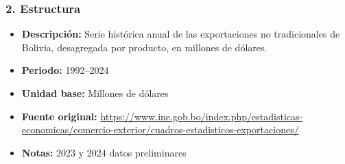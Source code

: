\documentclass[12pt,a4paper]{article}
\begin{document}
\subsubsection*{2. Estructura}
\begin{itemize}
   \item \textbf{Descripción:} Serie histórica anual de las exportaciones no tradicionales de Bolivia, desagregada por producto, en millones de dólares.
  \item \textbf{Periodo:} 1992--2024
  \item \textbf{Unidad base:} Millones de dólares
  \item \textbf{Fuente original:} \url{https://www.ine.gob.bo/index.php/estadisticas-economicas/comercio-exterior/cuadros-estadisticos-exportaciones/}
  \item \textbf{Notas:} 2023 y 2024 datos preliminares
\end{itemize}
\end{document}
